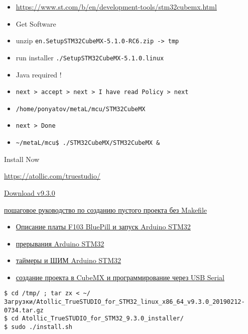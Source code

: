 
\begin{itemize}
  \item 
\url{https://www.st.com/b/en/development-tools/stm32cubemx.html}
  \item
Get Software
\item
unzip \verb|en.SetupSTM32CubeMX-5.1.0-RC6.zip -> tmp|
\item
run installer \verb|./SetupSTM32CubeMX-5.1.0.linux|
\item 
Java required !
\item
\verb|next > accept > next > I have read Policy > next|
\item 
\verb|/home/ponyatov/metaL/mcu/STM32CubeMX|
\item 
\verb|next > Done|
\item 
\verb|~/metaL/mcu$ ./STM32CubeMX/STM32CubeMX &|
\end{itemize}



 Install Now


\url{https://atollic.com/truestudio/}

\href{http://download.atollic.com/TrueSTUDIO/installers/Atollic_TrueSTUDIO_for_STM32_linux_x86_64_v9.3.0_20190212-0734.tar.gz}{Download v9.3.0}

\href{http://easyelectronics.ru/cozdanie-minimalnogo-proekta-pod-stm32-v-atollic-true-studio.html}{пошаговое руководство по созданию пустого проекта без Makefile}

\begin{itemize}
\item
\href{https://istarik.ru/blog/arduino/102.html}{Описание платы F103 BluePill и запуск Arduino STM32}
\item
\href{https://istarik.ru/blog/arduino/104.html}{прерывания Arduino STM32}
\item
\href{https://istarik.ru/blog/arduino/105.html}{таймеры и ШИМ Arduino STM32}
\item
\href{https://istarik.ru/blog/stm32/106.html}{создание проекта в CubeMX и программирование через USB Serial}
\end{itemize}

\begin{lstlisting}
$ cd /tmp/ ; tar zx < ~/Загрузки/Atollic_TrueSTUDIO_for_STM32_linux_x86_64_v9.3.0_20190212-0734.tar.gz
$ cd Atollic_TrueSTUDIO_for_STM32_9.3.0_installer/
$ sudo ./install.sh
\end{lstlisting}

\secup
